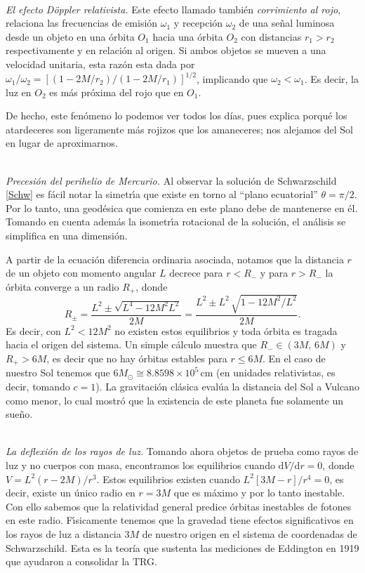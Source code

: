 \documentclass[12pt]{article}
\newcommand{\dx}{\textrm{d}}
\begin{document}
\ \\
\textit{El efecto Döppler relativista.\quad}
Este efecto llamado también {\it corrimiento al rojo}, relaciona las frecuencias de emisión $\omega_1$ y recepción $\omega_2$ de una señal luminosa desde un objeto en una órbita $O_1$ hacia una órbita $O_2$ con distancias $r_1 > r_2$ respectivamente y en relación al origen. Si ambos objetos se mueven a una velocidad unitaria, esta razón esta dada por $\omega_1/\omega_2 = [(1 - 2M/r_2)/(1 - 2M/r_1)]^{1/2}$, implicando que $\omega_2 < \omega_1$. Es decir, la luz en $O_2$ es más próxima del rojo que en $O_1$.

De hecho, este fenómeno lo podemos ver todos los días, pues explica porqué los atardeceres son ligeramente más rojizos que los amaneceres; nos alejamos del Sol en lugar de aproximarnos.



\ \\
\textit{Precesión del perihelio de Mercurio.\quad}
Al observar la soluci\'on de Schwarzschild \eqref{Schw} es f\'acil notar la simetr\'{\i}a que existe en torno al ``plano ecuatorial'' $\theta=\pi/2$. Por lo tanto, una geod\'esica que comienza en este plano debe de mantenerse en \'el. Tomando en cuenta adem\'as la isometr\'{\i}a rotacional de la soluci\'on, el an\'alisis se simplifica en una dimensión.

A partir de la ecuación diferencia ordinaria asociada, notamos que la distancia $r$ de un objeto con momento angular $L$ decrece para $r < R_-$ y para $r > R_-$ la órbita converge a un radio $R_+$, donde
$$R_{\pm} = \frac{L^2 \pm \sqrt{L^4 - 12 M^2 L^2}}{2M} = \frac{L^2 \pm L^2\,\sqrt{1 - 12M^2/L^2}}{2M}.$$
Es decir, con $L^2 < 12M^2$ no existen estos equilibrios y toda órbita es tragada hacia el origen del sistema. Un simple cálculo muestra que $R_- \in (3M,\,6M)$ y $R_+ > 6M$, es decir que no hay órbitas estables para $r \leq 6M$. En el caso de nuestro Sol tenemos que $6M_{\odot}\cong 8.8598\times 10^5$\,cm (en unidades relativistas, es decir, tomando $c=1$). La gravitación clásica evalúa la distancia del Sol a Vulcano como menor, lo cual mostró que la existencia de este planeta fue solamente un sueño.



\ \\
\textit{La deflexi\'on de los rayos de luz.\quad}
Tomando ahora objetos de prueba como rayos de luz y no cuerpos con masa, encontramos los equilibrios cuando $\dx V/\dx r = 0$, donde $V = L^2(r - 2M)/r^3$. Estos equilibrios existen cuando ${L^2[3M-r]}/{r^4} = 0$, es decir, existe un único radio en $r = 3M$ que es máximo y por lo tanto inestable. Con ello sabemos que la relatividad general predice \'orbitas inestables de fotones en este radio. F\'{\i}sicamente tenemos que la gravedad tiene efectos significativos en los rayos de luz a distancia $3M$ de nuestro origen en el sistema de coordenadas de Schwarzschild. Esta es la teoría que sustenta las mediciones de Eddington en 1919 que ayudaron a consolidar la TRG.
\end{document}
